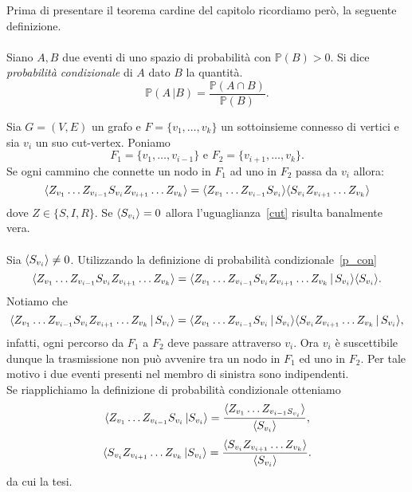 Prima di presentare il teorema cardine del capitolo  
ricordiamo per\`o, la seguente definizione.\\ \\
Siano $A,B$ due eventi di uno spazio di probabilit\`a con $\mathbb{P}(B)>0$. Si dice \textit{probabilit\`a condizionale} di $A$ dato $B$ la quantit\`a.
\begin{equation} 
\label{p_con}
\mathbb{P}(A\, \vert B) = \frac{ \mathbb{P}(A\cap B)}{\mathbb{P}(B)}.
\end{equation}

\begin{thm}\label{th_cut-vertex}
Sia $G=(V,E)$ un grafo e $F=\{ v_1, \dots, v_k\}$ un sottoinsieme connesso di vertici e sia $v_i$ un suo cut-vertex. Poniamo  $$ F_1 = \{ v_1, \dots, v_{i-1}\} \text{ e }  F_2 =\{ v_{i+1}, \dots, v_k\}.$$ 
Se ogni cammino che connette un nodo in $F_1$ ad uno in $F_2$ passa da $v_i$ allora: 
\begin{equation}\label{cut}\langle  Z_{v_1}\dots Z_{v_{i-1}} S_{v_i} Z_{v_{i+1}} \dots Z_{v_k} \rangle = \langle  Z_{v_1}\dots Z_{v_{i-1}} S_{v_i} \rangle \langle S_{v_i}  Z_{v_{i+1}} \dots Z_{v_k} \rangle	
\end{equation}
dove $Z\in \{ S,I,R\}$. 
\proof  
Se $\langle S_{v_i} \rangle=0$ allora l'uguaglianza~\eqref{cut} risulta banalmente vera.\\ \\ 
Sia $\langle S_{v_i} \rangle\neq 0 $. Utilizzando la definizione di  probabilit\`a condizionale~\eqref{p_con}
$$ \langle  Z_{v_1}\dots Z_{v_{i-1}} S_{v_i} Z_{v_{i+1}}\dots Z_{v_k} \rangle = \langle  Z_{v_1}\dots Z_{v_{i-1}} S_{v_i} Z_{v_{i+1}}\dots Z_{v_k}\, \vert \, S_{v_i} \rangle \langle S_{v_i} \rangle.$$
Notiamo che $$ \langle  Z_{v_1}\dots Z_{v_{i-1}} S_{v_i} Z_{v_{i+1}}\dots Z_{v_k}\, \vert \, S_{v_i} \rangle = \langle  Z_{v_1}\dots Z_{v_{i-1}} S_{v_i} \, \vert\, S_{v_i} \rangle \langle S_{v_i}Z_{v_{i+1}}\dots Z_{v_k}\, \vert \, S_{v_i} \rangle,$$ 
infatti, ogni percorso da $F_1$ a $F_2$ deve passare attraverso $v_i$. Ora  $v_i$ \`e suscettibile dunque la trasmissione non pu\`o avvenire tra un nodo in $F_1$ ed uno in $F_2$. Per tale motivo i due eventi presenti nel membro di sinistra sono indipendenti.\\
Se riapplichiamo la definizione di probabilit\`a condizionale otteniamo  
$$ \langle  Z_{v_1} \dots Z_{v_{i-1}}S_{v_i} \, \vert S_{v_i} \rangle =\frac{ \langle Z_{v_1} \dots Z_{v_{i-1} S_{v_i}} \rangle}{\langle  S_{v_i} \rangle},$$
$$ \langle  S_{v_i} Z_{v_{i+1}}\dots Z_{v_{k}} \, \vert S_{v_i} \rangle =\frac{ \langle S_{v_i}Z_{v_{i+1}} \dots Z_{v_{k}} \rangle}{\langle  S_{v_i} \rangle}.$$
da cui la tesi.
\endproof
\end{thm}
